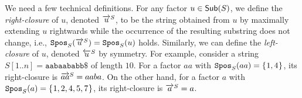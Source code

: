 \documentclass{article}
\begin{document}
We need a few technical definitions. 
For any factor $u \in \mathsf{Sub}(S)$, we define the \textit{right-closure} of $u$, denoted $\overrightarrow{u}^{S}$, to be the string obtained from $u$ by maximally extending $u$ rightwards while the occurrence of the resulting substring does not change, i.e., $\mathtt{Spos}_{S}(\overrightarrow{u}^{S}) = \mathtt{Spos}_{S}(u)$ holds.
Similarly, we can define the \textit{left-closure} of $u$, denoted $\overleftarrow{u}^{S}$ by symmetry. 
For example, consider a string  $S[1..n] = \mathtt{aabaababb\$}$ of length $10$. For a factor $aa$ with $\mathtt{Spos}_{S}(aa) = \{\kern0.05em1, 4\kern0.05em\}$, its right-closure is $\overrightarrow{aa}^{S} = aaba$. On the other hand, for a factor $a$ with $\mathtt{Spos}_{S}(a) = \{\kern0.05em1,2,4,5,7\kern0.05em\}$, its right-closure is $\overrightarrow{a}^{S} = a$. 


\end{document}
